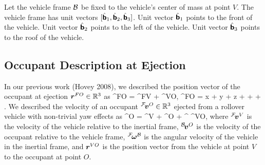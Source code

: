 \documentclass[10pt,twocolumn,reqno]{amsart}
\begin{document}
Let the vehicle frame $\mathcal{B}$ be fixed to the vehicle's center of mass at point $V$.
The vehicle frame has unit vectors $[\hat{\mbox{\boldmath $\sf{b}$}}_1, \hat{\mbox{\boldmath $\sf{b}$}}_2, \hat{\mbox{\boldmath $\sf{b}$}}_3]$.
Unit vector $\hat{\mbox{\boldmath $\sf{b}$}}_1$ points to the front of the vehicle.
Unit vector $\hat{\mbox{\boldmath $\sf{b}$}}_2$ points to the left of the vehicle.
Unit vector $\hat{\mbox{\boldmath $\sf{b}$}}_3$ points to the roof of the vehicle.

\subsection{Occupant Description at Ejection}
In our previous work (Hovey 2008), we described the position vector of the 
occupant at ejection $\mbox{\boldmath $r$}^{FO} \in \mathbb{R}^3$ as
\be
 \vr^{FO} = \vr^{FV} + \vr^{VO}, 
\ee
\be
 \vr^{FO} = x \; \vefa + y \; \vefb + z \; \vefc + \chi \; \veba + \rho \cos \phi 
 \; \vebb + \rho \sin \phi \; \vebc.
\ee
We described the velocity of an occupant 
${}^{\mathcal{F}}\!\mbox{\boldmath $v$}^{O} \in \mathbb{R}^3$
ejected from a rollover vehicle with non-trivial yaw effects as
\be
{}\vv^{O} =  \vv^{V} +  \vv^{O} +  \vomega^{\cB} \times \vr^{VO},
 \label{eq:velocity}
\ee
where ${}^{\mathcal{F}}\!\mbox{\boldmath $v$}^{V}$ is the velocity of the vehicle relative to the inertial frame, 
${}^{\mathcal{B}}\!\mbox{\boldmath $v$}^{O}$ is the velocity of the occupant relative to the vehicle frame,
${}^{\mathcal{F}}\!\mbox{\boldmath $\omega$}^{\mathcal{B}}$ is the angular velocity of the vehicle in the inertial frame,
and
$\mbox{\boldmath $r$}^{VO}$ is the position vector from the vehicle at point $V$ to the occupant at point $O$.
\end{document}
